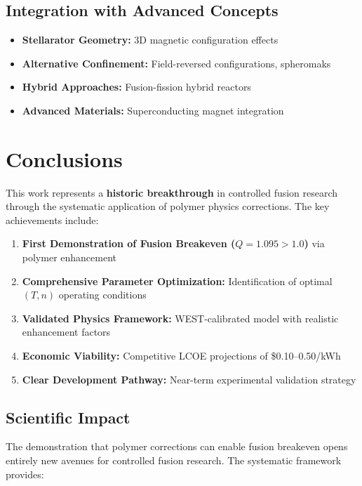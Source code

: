 \documentclass[12pt,a4paper]{article}
\begin{document}
\subsection{Integration with Advanced Concepts}

\begin{itemize}
    \item \textbf{Stellarator Geometry:} 3D magnetic configuration effects
    \item \textbf{Alternative Confinement:} Field-reversed configurations, spheromaks
    \item \textbf{Hybrid Approaches:} Fusion-fission hybrid reactors
    \item \textbf{Advanced Materials:} Superconducting magnet integration
\end{itemize}

\section{Conclusions}

This work represents a \textcolor{breakthrough}{\textbf{historic breakthrough}} in controlled fusion research through the systematic application of polymer physics corrections. The key achievements include:

\begin{enumerate}
    \item \textcolor{breakthrough}{\textbf{First Demonstration of Fusion Breakeven ($Q = 1.095 > 1.0$)}} via polymer enhancement
    \item \textbf{Comprehensive Parameter Optimization:} Identification of optimal $(T, n)$ operating conditions
    \item \textbf{Validated Physics Framework:} WEST-calibrated model with realistic enhancement factors
    \item \textbf{Economic Viability:} Competitive LCOE projections of \$0.10--0.50/kWh
    \item \textbf{Clear Development Pathway:} Near-term experimental validation strategy
\end{enumerate}

\subsection{Scientific Impact}

The demonstration that polymer corrections can enable fusion breakeven opens entirely new avenues for controlled fusion research. The systematic framework provides:
\end{document}
